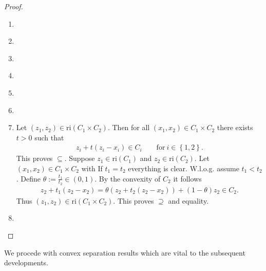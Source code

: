 \begin{proof}
\begin{enumerate}[label={(\roman*)}]
  \item
    \cite[Theorem~6.4]{Rockafellar1970}
  \item
    \cite[Theorem~6.2]{Rockafellar1970}
  \item
    \cite[Theorem~6.2]{Rockafellar1970}
  \item
    \cite[Theorem~6.3]{Rockafellar1970}
  \item
    \cite[Theorem~6.5]{Rockafellar1970}
  \item
    \cite[Theorem~6.6-6.7]{Rockafellar1970}
  \item
Let
  $
  (z_1, z_2)
  \in 
  \mathrm{ri}(C_1\times C_2).
  $
  Then for all 
  $
  (x_1, x_2)
  \in 
  C_1\times C_2
  $
  there exists
  $t>0$
  such that
  \begin{gather}
      z_i + t (z_i-x_i)
      \in C_i
      \qquad
      \text{for}\ 
      i\in \left\{ 1,2 \right\}.
  \end{gather}
  This proves $\subseteq.$
  Suppose 
  $
    z_1 
    \in
    \mathrm{ri}(C_1)
  $
  and
  $
    z_2 
    \in
    \mathrm{ri}(C_2).
  $
  Let
  $
    (x_1,x_2)\in C_1\times C_2
  $
  with
  If $t_1=t_2$ everything is clear.
  W.l.o.g.
  assume 
  $t_1<t_2$. Define $\theta:=\frac{t_1}{t_2}\in (0,1).$
  By the convexity of $C_2$ it follows
  \begin{gather}
    z_2 + t_1 (z_2 - x_2)
    =
    \theta
    (
    z_2 + t_2 (z_2 - x_2)
    )
    +
    (1-\theta)z_2
    \in C_2.
  \end{gather}
  Thus
  $
  (z_1,z_2)\in\mathrm{ri}(C_1\times C_2). 
  $
  This proves $\supseteq$ and equality.
  \item
    \cite[Theorem~2.92]{Mordukhovich2022}
\end{enumerate}
\end{proof}
 
We procede with convex separation results which are vital to the subsequent developments.

